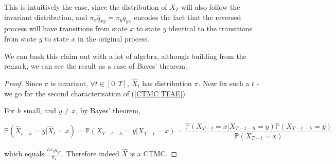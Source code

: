 \documentclass[11pt]{scrartcl}
\begin{document}
\begin{remark}
This is intuitively the case, since the distribution of $X_T$ will also follow the invariant distribution, and $\pi_x \hat{q}_{xy} = \pi_y q_{yx}$ encodes the fact that the reversed process will have transitions from state $x$ to state $y$ identical to the transitions from state $y$ to state $x$ in the original process. 
\end{remark}

We can bash this claim out with a lot of algebra, although building from the remark, we can see the result as a case of Bayes' theorem.

\begin{proof}
Since $\pi$ is invariant, $\forall t \in [0, T]$, $\hat{X}_t$ has distribution $\pi$. Now fix such a $t$ - we go for the second characterisation of (\ref{CTMC TFAE}). 

For $h$ small, and $y \neq x$, by Bayes' theorem,

\begin{equation}
    \mathbb{ P}( \hat{X}_{t+h} = y | \hat{X}_t = x) = \mathbb{ P}( X_{T-t-h} = y | X_{T-t} = x ) = \frac{\mathbb{ P}(X_{T-t}=x | X_{T-t-h}=y) \mathbb{ P}(X_{T-t-h}=y)}{\mathbb{ P}(X_{T-t}=x)}
\end{equation}

which equals $\frac{h \pi_y q_{yx}}{\pi_x}$. Therefore indeed $\hat{X}$ is a CTMC.

\end{proof}
\end{document}

